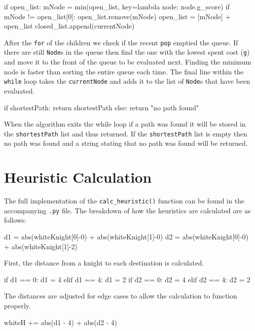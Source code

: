 \documentclass[12pt, letterpaper, final, onecolumn, titlepage] {article}
\begin{document}
\begin{python}
if open_list:
    mNode = min(open_list, key=lambda node: node.g_score)                           
    if mNode != open_list[0]:                                                      
        open_list.remove(mNode) 
        open_list = [mNode] + open_list
closed_list.append(currentNode)
\end{python}

\noindent After the \texttt{for} of the children we check if the recent \texttt{pop} emptied the queue. If there are still \texttt{Node}s in the queue then find the one with the lowest spent cost (\texttt{g}) and move it to the front of the queue to be evaluated next.  Finding the minimum node is faster than sorting the entire queue each time.
The final line within the \texttt{while} loop takes the \texttt{currentNode} and adds it to the list of \texttt{Node}s that have been evaluated.
\vspace{0.4cm}
\begin{python}
if shortestPath:
    return shortestPath
else:
    return "no path found"
\end{python}

\noindent When the algorithm exits the while loop if a path was found it will be stored in the \texttt{shortestPath} list and thus returned.  If the \texttt{shortestPath} list is empty then no path was found and a string stating that no path was found will be returned.
\newpage

\section{Heuristic Calculation}

The full implementation of the \texttt{calc\_heuristic()} function can be found in the accompanying \texttt{.py} file.
The breakdown of how the heuristics are calculated are as follows:
\begin{python}
d1 = abs(whiteKnight[0]-0) + abs(whiteKnight[1]-0)
d2 = abs(whiteKnight[0]-0) + abs(whiteKnight[1]-2)
\end{python}

\noindent First, the distance from a knight to each destination is calculated.
\vspace{0.4cm}
\begin{python}
if d1 == 0:
    d1 = 4
elif d1 == 4:
    d1 = 2
if d2 == 0:
    d2 = 4
elif d2 == 4:
    d2 = 2
\end{python}

\noindent The distances are adjusted for edge cases to allow the calculation to function properly.
\vspace{0.4cm}
\begin{python}
whiteH += abs(d1 - 4) + abs(d2 - 4)
\end{python}
\end{document}
